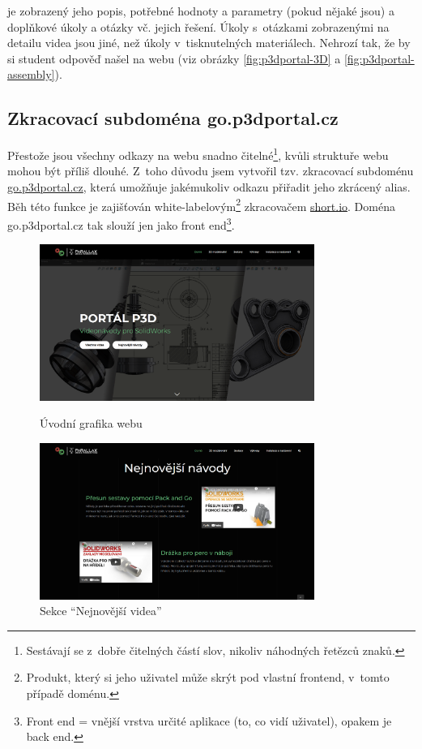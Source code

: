 \noindent{} je zobrazený jeho popis, potřebné hodnoty a parametry (pokud nějaké jsou) a doplňkové úkoly a otázky vč. jejich řešení. Úkoly s~otázkami zobrazenými na detailu videa jsou jiné, než úkoly v~tisknutelných materiálech. Nehrozí tak, že by si student odpověď našel na webu (viz obrázky \ref{fig:p3dportal-3D} a \ref{fig:p3dportal-assembly}).

\subsection{Zkracovací subdoména go.p3dportal.cz}
Přestože jsou všechny odkazy na webu snadno čitelné\footnote{Sestávají se z~dobře čitelných částí slov, nikoliv náhodných řetězců znaků.}, kvůli struktuře webu mohou být příliš dlouhé.
Z~toho důvodu jsem vytvořil tzv. zkracovací subdoménu \href{https://go.p3dportal.cz}{go.p3dportal.cz}, která umožňuje jakémukoliv odkazu přiřadit jeho zkrácený alias.
Běh této funkce je zajišťován white-labelovým\footnote{Produkt, který si jeho uživatel může skrýt pod vlastní frontend, v~tomto případě doménu.} zkracovačem \href{https://short.io}{short.io}.
Doména go.p3dportal.cz tak slouží jen jako front end\footnote{Front end = vnější vrstva určité aplikace (to, co vidí uživatel), opakem je back end.}.

\begin{figure}[htbp]
    \centering
    \begin{minipage}[b]{0.45\textwidth}
        \centering
        \includegraphics[width=0.8\textwidth]{img/020/web/web-hp1.png}
        \caption{Úvodní grafika webu}
        \label{fig:p3dportal-hp1}
    \end{minipage}
    \qquad
    \begin{minipage}[b]{0.45\textwidth}
        \centering
        \includegraphics[width=0.8\textwidth]{img/020/web/web-hp2.png}
        \caption{Sekce \enquote{Nejnovější videa}}
        \label{fig:p3dportal-hp2}
    \end{minipage}
\end{figure}


